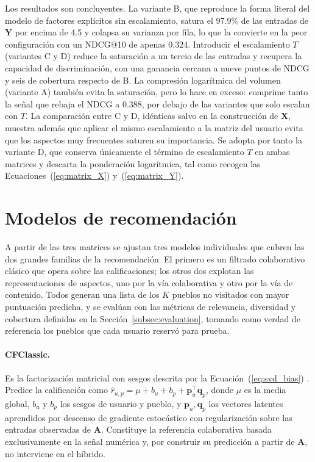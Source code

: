 Los resultados son concluyentes. La variante B, que reproduce la forma literal del modelo de
factores explícitos sin escalamiento, satura el 97.9\% de las entradas de $\mathbf{Y}$ por encima
de 4.5 y colapsa su varianza por fila, lo que la convierte en la peor configuración con un NDCG@10
de apenas 0.324. Introducir el escalamiento $T$ (variantes C y D) reduce la saturación a un tercio
de las entradas y recupera la capacidad de discriminación, con una ganancia cercana a nueve puntos
de NDCG y seis de cobertura respecto de B. La compresión logarítmica del volumen (variante A)
también evita la saturación, pero lo hace en exceso: comprime tanto la señal que rebaja el NDCG a
0.388, por debajo de las variantes que solo escalan con $T$. La comparación entre C y D, idénticas
salvo en la construcción de $\mathbf{X}$, muestra además que aplicar el mismo escalamiento a la
matriz del usuario evita que los aspectos muy frecuentes saturen su importancia. Se adopta por
tanto la variante D, que conserva únicamente el término de escalamiento $T$ en ambas matrices y
descarta la ponderación logarítmica, tal como recogen las Ecuaciones~(\ref{eq:matrix_X})
y~(\ref{eq:matrix_Y}).

\section{Modelos de recomendación}\label{sec:modelos}

A partir de las tres matrices se ajustan tres modelos individuales que cubren las dos grandes
familias de la recomendación. El primero es un filtrado colaborativo clásico que opera sobre las
calificaciones; los otros dos explotan las representaciones de aspectos, uno por la vía
colaborativa y otro por la vía de contenido. Todos generan una lista de los $K$ pueblos no
visitados con mayor puntuación predicha, y se evalúan con las métricas de relevancia, diversidad
y cobertura definidas en la Sección~\ref{subsec:evaluation}, tomando como verdad de referencia los
pueblos que cada usuario reservó para prueba.

\paragraph{CFClassic.} Es la factorización matricial con sesgos descrita por la
Ecuación~(\ref{eq:svd_bias}) \citep{koren_matrix_2009}. Predice la calificación como
$\hat{r}_{u,p} = \mu + b_u + b_p + \mathbf{p}_u^\top \mathbf{q}_p$, donde $\mu$ es la media global,
$b_u$ y $b_p$ los sesgos de usuario y pueblo, y $\mathbf{p}_u, \mathbf{q}_p$ los vectores latentes
aprendidos por descenso de gradiente estocástico con regularización sobre las entradas observadas
de $\mathbf{A}$. Constituye la referencia colaborativa basada exclusivamente en la señal numérica
y, por construir su predicción a partir de $\mathbf{A}$, no interviene en el híbrido.

